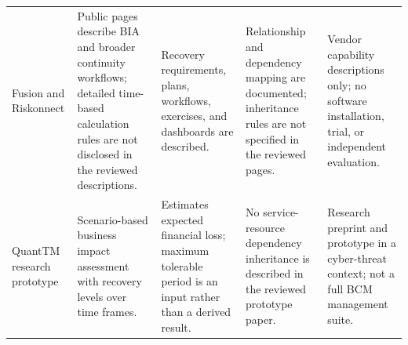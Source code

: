 \begin{table}
\begin{tabularx}{\linewidth}{>{\raggedright\arraybackslash}p{2.8cm} >{\raggedright\arraybackslash}X >{\raggedright\arraybackslash}X >{\raggedright\arraybackslash}X >{\raggedright\arraybackslash}X}
Fusion and Riskonnect \cite{fusion2026bcm,riskonnect2026bcm} & Public pages describe BIA and broader continuity workflows; detailed time-based calculation rules are not disclosed in the reviewed descriptions. & Recovery requirements, plans, workflows, exercises, and dashboards are described. & Relationship and dependency mapping are documented; inheritance rules are not specified in the reviewed pages. & Vendor capability descriptions only; no software installation, trial, or independent evaluation. \\
QuantTM research prototype \cite{vonderassen2024quanttm} & Scenario-based business impact assessment with recovery levels over time frames. & Estimates expected financial loss; maximum tolerable period is an input rather than a derived result. & No service-resource dependency inheritance is described in the reviewed prototype paper. & Research preprint and prototype in a cyber-threat context; not a full BCM management suite. \\
\bottomrule
\end{tabularx}
\end{table}
